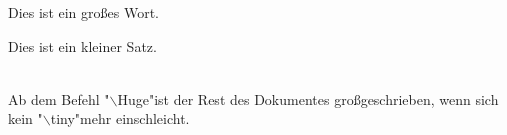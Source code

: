 \documentclass{article}
\begin{document}
Dies ist ein {\Huge gro\ss es} Wort.\\
\begin{scriptsize}Dies ist ein kleiner Satz.\end{scriptsize}\\
Ab dem Befehl "$\backslash$Huge"\Huge ist der Rest des Dokumentes gro\ss  geschrieben,
 wenn sich kein "$\backslash$tiny"\tiny mehr einschleicht.
\end{document}
